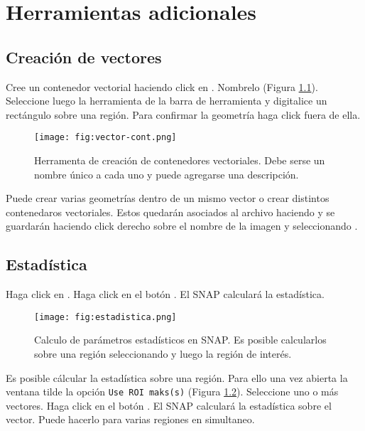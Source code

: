 \chapter{Herramientas adicionales}\label{ap:HA}

\section{Creación de vectores}

Cree un contenedor vectorial haciendo click en . Nombrelo  (Figura \ref{fig:vector-cont}). Seleccione luego la herramienta  de la barra de herramienta y digitalice un rectángulo sobre una región. Para confirmar la geometría haga click fuera de ella.

\begin{figure}[h!]
    \centering
    \texttt{[image: fig:vector-cont.png]}
    \caption{Herramenta de creación de contenedores vectoriales. Debe serse un nombre único a cada uno y puede agregarse una descripción.}
    \label{fig:vector-cont}
\end{figure}

Puede crear varias geometrías dentro de un mismo vector o crear distintos contenedaros vectoriales. Estos quedarán asociados al archivo haciendo y se guardarán haciendo click derecho sobre el nombre de la imagen y seleccionando .

\section{Estadística}

Haga click en . Haga click en el botón . El SNAP calculará la estadística.

\begin{figure}[ht!]
    \centering
    \texttt{[image: fig:estadistica.png]}
    \caption{Calculo de parámetros estadísticos en SNAP. Es posible calcularlos sobre una región seleccionando  y luego la región de interés.}
    \label{fig:estadistica}
\end{figure}


Es posible cálcular la estadística sobre una región. Para ello una vez abierta la ventana tilde la opción \texttt{Use ROI maks(s)} (Figura \ref{fig:estadistica}). Seleccione uno o más vectores. Haga click en el botón . El SNAP calculará la estadística sobre el vector. Puede hacerlo para varias regiones en simultaneo.

